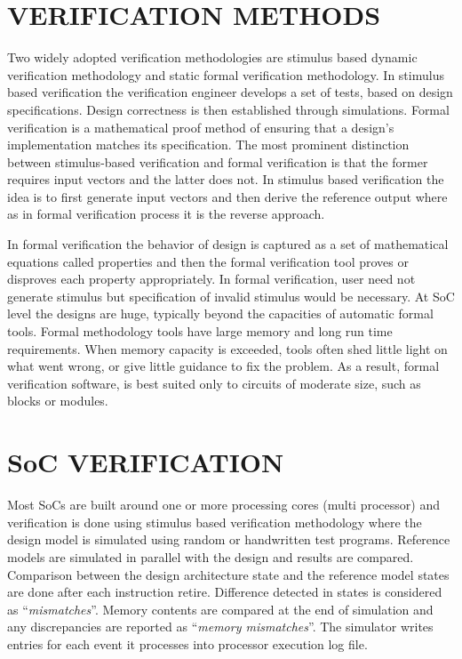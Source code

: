 \section{VERIFICATION METHODS}
Two widely adopted verification methodologies are stimulus based dynamic verification methodology and static formal verification methodology. In stimulus based verification the verification engineer develops a set of tests, based on design specifications. Design correctness is then established through simulations. Formal verification is a mathematical proof method of ensuring that a design's implementation matches its specification. The most prominent distinction between stimulus-based verification and formal verification is that the former requires input vectors and the latter does not. In stimulus based verification the idea is to first generate input vectors and then derive the reference output where as in formal verification process it is the reverse approach.

In formal verification the behavior of design is captured as a set of mathematical equations called properties and then the formal verification tool proves or disproves each property appropriately. In formal verification, user need not generate stimulus but specification of invalid stimulus would be necessary.  At SoC level the designs are huge, typically beyond the capacities of automatic formal tools. Formal methodology tools have large memory and long run time requirements. When memory capacity is exceeded, tools often shed little light on what went wrong, or give little guidance to fix the problem. As a result, formal verification software, is best suited only to circuits of moderate size, such as blocks or modules. 

\section{SoC VERIFICATION}
Most SoCs are built around one or more processing cores (multi processor) and verification is done using stimulus based verification methodology where the design model is simulated using random or handwritten test programs. Reference models are simulated in parallel with the design and results are compared.  Comparison between the design architecture state and the reference model states are done after each instruction retire. Difference detected in states is considered as ``{\it mismatches}''. Memory contents are compared at the end of simulation and any discrepancies are reported as ``{\it memory mismatches}''.  The simulator writes entries for each event it processes into processor execution log file.

